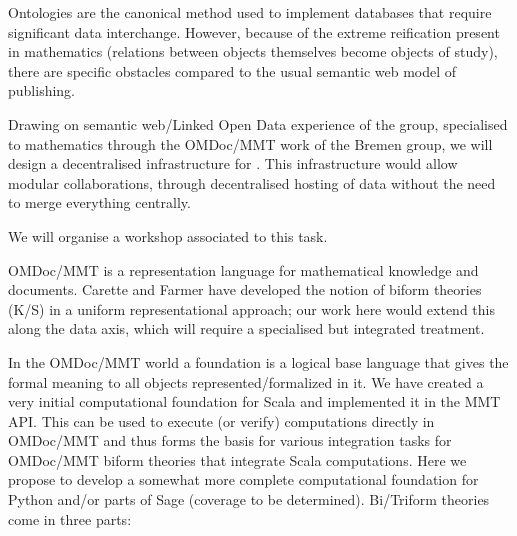 \begin{workpackage}[id=dksbases,wphases=1-48!.5,
  title=Data/Knowledge/Software-Bases,lead=JU,
  ZHRM=12,JURM=36,USHRM=12,UWRM=25,SARM=10,LLRM=2,PSRM=4]
\begin{tasklist}
\begin{task}[id=data-design,lead=JU,partners={ZH,US,SA,UW,LL},
  title={Formulation of requirements and design of new  infrastructure when appropriate}]

  Ontologies are the canonical method used to implement databases that require significant
  data interchange. However, because of the extreme reification present in mathematics
  (relations between objects themselves become objects of study), there are specific
  obstacles compared to the usual semantic web model of publishing.

  Drawing on semantic web/Linked Open Data experience of the  group, specialised to
  mathematics through the OMDoc/MMT work of the Bremen group, we will design a
  decentralised infrastructure for \TheProject. This infrastructure would allow modular
  collaborations, through decentralised hosting of data without the need to merge
  everything centrally.

 We will organise a workshop associated to this task.
\end{task}

\begin{task}[title=Triform Theories in OMDoc/MMT,id=data-triform,
  lead=JU,partners={ZH}]
OMDoc/MMT is a representation language for mathematical knowledge and documents. Carette and Farmer have developed the notion of biform theories (K/S) in a uniform representational approach; our work here would extend this along the data axis, which will require a specialised but integrated treatment.
\end{task}

\begin{task}[title=Computational Foundation for Python/Sage (or some CAS),
  id=data-foundationCAS,lead=JU,partners={ZH,SA}]

In the OMDoc/MMT world a foundation is a logical base language that
gives the formal meaning to all objects represented/formalized in
it. We have created a very initial computational foundation for Scala
and implemented it in the MMT API. This can be used to execute (or
verify) computations directly in OMDoc/MMT and thus forms the basis
for various integration tasks for OMDoc/MMT biform theories that
integrate Scala computations. Here we propose to develop a somewhat
more complete computational foundation for Python and/or parts of Sage
(coverage to be determined). Bi/Triform theories come in three parts:
\begin{compactitem}


\end{compactitem}
\end{task}
\end{tasklist}
\end{workpackage}
